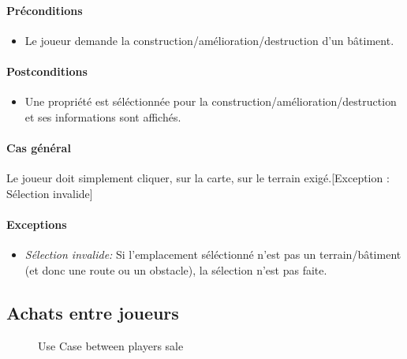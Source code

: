 \documentclass[a4paper,11pt]{report}
\begin{document}
\paragraph{Préconditions}
\begin{itemize}
 \item Le joueur demande la construction/amélioration/destruction d'un bâtiment.
\end{itemize}
\paragraph{Postconditions}
\begin{itemize}
 \item Une propriété est séléctionnée pour la construction/amélioration/destruction et ses informations sont affichés.
\end{itemize}
\paragraph{Cas général}
Le joueur doit simplement cliquer, sur la carte, sur le terrain exigé.[Exception : Sélection invalide]
\paragraph{Exceptions}
\begin{itemize}
 \item \textit{Sélection invalide:} Si l'emplacement séléctionné n'est pas un terrain/bâtiment (et donc une route ou un obstacle), la sélection n'est pas faite.
\end{itemize}

\newpage
\subsection{Achats entre joueurs}
\begin{figure}[ht]
    \caption{Use Case between players sale}
\end{figure}
\end{document}
